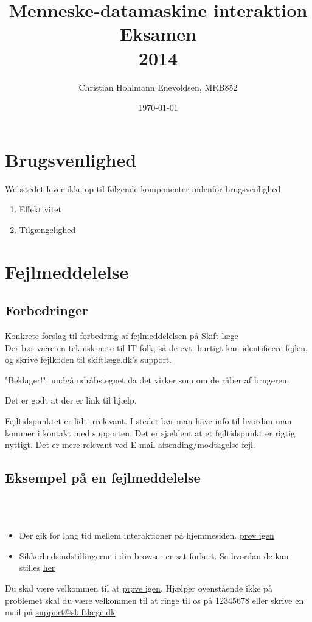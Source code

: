 \documentclass[12pt,a4paper,oneside]{article}
\begin{document}
\title{Menneske-datamaskine interaktion\\Eksamen\\2014}
\author{Christian Hohlmann Enevoldsen, MRB852}
\date{\today}
\maketitle
\newpage

\section{Brugsvenlighed}

Webstedet lever ikke op til følgende komponenter indenfor brugsvenlighed

\begin{enumerate}
\item{Effektivitet}
\item{Tilgængelighed}

\end{enumerate}

\section{Fejlmeddelelse}

\subsection{Forbedringer}
Konkrete forslag til forbedring af fejlmeddelelsen på Skift læge\\

Der bør være en teknisk note til IT folk, så de evt. hurtigt kan identificere fejlen, og skrive fejlkoden til skiftlæge.dk's support. 

"Beklager!": undgå udråbstegnet da det virker som om de råber af brugeren.

Det er godt at der er link til hjælp.

Fejltidspunktet er lidt irrelevant. I stedet bør man have info til hvordan man kommer i kontakt med supporten. Det er sjældent at et fejltidspunkt er rigtig nyttigt. Det er mere relevant ved E-mail afsending/modtagelse fejl.\\

\subsection{Eksempel på en fejlmeddelelse}


\\
\\
\begin{itemize}
\item{Der gik for lang tid mellem interaktioner på hjemmesiden. \underline{prøv igen}} 
\item{Sikkerhedsindstillingerne i din browser er sat forkert. Se hvordan de kan stilles \underline{her}}
\end{itemize}
Du skal være velkommen til at \underline{prøve igen}. Hjælper ovenstående ikke på problemet skal du være velkommen til at ringe til os på 12345678 eller skrive en mail på \underline{support@skiftlæge.dk}
 
\end{document}
